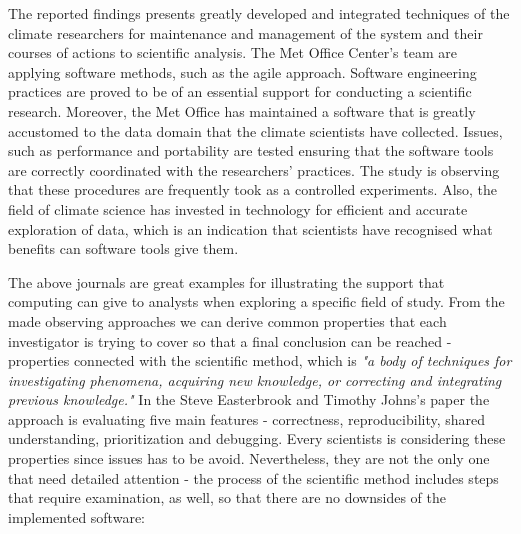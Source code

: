 The reported findings presents greatly developed and integrated techniques of the climate researchers for maintenance and management of the system and their courses of actions to scientific analysis. The Met Office Center's team are applying software methods, such as the agile approach. Software engineering practices are proved to be of an essential support for conducting a scientific research. Moreover, the Met Office has maintained a software that is greatly accustomed to the data domain that the climate scientists have collected. Issues, such as performance and portability are tested ensuring that the software tools are correctly coordinated with the researchers' practices. The study is observing that these procedures are frequently took as a controlled experiments. Also, the field of climate science has invested in technology for efficient and accurate exploration of data, which is an indication that scientists have recognised what benefits can software tools give them. \cite{easterbrook2009engineering}

The above journals are great examples for illustrating the support that computing can give to analysts when exploring a specific field of study. From the made observing approaches we can derive common properties that each investigator is trying to cover so that a final conclusion can be reached - properties connected with the scientific method, which is \textit{"a body of techniques for investigating phenomena, acquiring new knowledge, or correcting and integrating previous knowledge."}\cite{sciMethod} In the Steve Easterbrook and Timothy Johns's paper \cite{easterbrook2009engineering} the approach is evaluating five main features - correctness, reproducibility, shared understanding, prioritization and debugging. Every scientists is considering these properties since issues has to be avoid. Nevertheless, they are not the only one that need detailed attention - the process of the scientific method includes steps that require examination, as well, so that there are no downsides of the implemented software:\cite{sciMethod}\cite{chasmSoftware}

